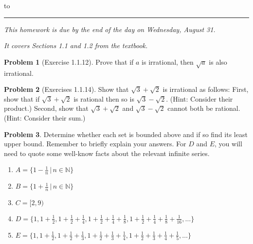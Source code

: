 \documentclass[12pt]{article}
\newcommand{\N}{{\mathbb N}}
\theoremstyle{definition}
\newtheorem{problem}{Problem}
\newenvironment{answer}{\par\medskip\bgroup\color{darkblue}}{\egroup\par\medskip}
\begin{document}
\hbox to 
\nointerlineskip
\vskip 2pt
\hrule height 1pt

\bigskip

\centerline{\textit{This homework is due by the end of the day on Wednesday, August 31.}}
\centerline{\textit{It covers Sections 1.1 and 1.2 from the textbook.}}

\bigskip


\begin{problem}[Exercise 1.1.12]     %
Prove that if $a$ is irrational, then $\sqrt{a}$ is also irrational.
\end{problem}

\begin{answer}
\end{answer}



\begin{problem}[Exercises 1.1.14]   %
Show that $\sqrt{3}+\sqrt{2}$ is irrational as follows: First, show that if $\sqrt{3}+\sqrt{2}$
is rational then so is $\sqrt{3}-\sqrt{2}$.  (Hint: Consider their product.) Second, show that
$\sqrt{3}+\sqrt{2}$ and $\sqrt{3}-\sqrt{2}$ cannot both be rational. (Hint: Consider their sum.)
\end{problem}

\begin{answer}
\end{answer}



\begin{problem}    %
Determine whether each set is bounded above and if so find its least upper bound.
Remember to briefly explain your answers.  For $D$ and $E$, you will need to quote some 
well-know facts about the relevant infinite series.
   \begin{enumerate}
   \item[] $A=\{1-\frac{1}{n}\,|\,n\in\N\}$
   \item[] $B=\{1+\frac{1}{n}\,|\,n\in\N\}$
   \item[] $C=[2,9)$
   \item[] $D=\{1,1+\frac{1}{2},1+\frac{1}{2}+\frac{1}{4},1+\frac{1}{2}+\frac{1}{4}+\frac{1}{8},1+\frac{1}{2}+\frac{1}{4}+\frac{1}{8}+\frac{1}{16},\dots\}$
   \item[] $E=\{1,1+\frac{1}{2},1+\frac{1}{2}+\frac{1}{3},1+\frac{1}{2}+\frac{1}{3}+\frac{1}{4},1+\frac{1}{2}+\frac{1}{3}+\frac{1}{4}+\frac{1}{5},\dots\}$
   \end{enumerate}
\end{problem}
\end{document}

